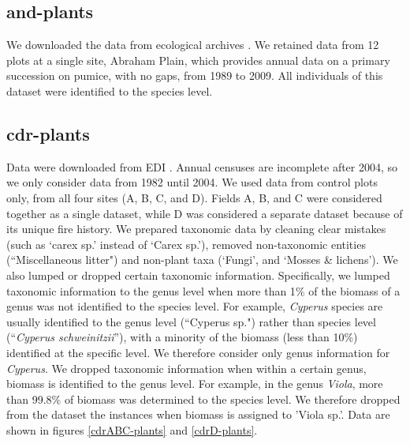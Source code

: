\documentclass[11pt, oneside]{article}
\begin{document}
\subsection {and-plants}
We downloaded the data from ecological archives \citep{cdr-del_moral_thirty_2010}. We retained data from 12 plots at a single site, Abraham Plain, which provides annual data on a primary succession on pumice, with no gaps, from 1989 to 2009. All individuals of this dataset were identified to the species level.

\subsection {cdr-plants}
Data were downloaded from EDI \citep{cdr-plants}.
Annual censuses are incomplete after 2004, so we only consider data from 1982 until 2004. 
We used data from control plots only, from all four sites (A, B, C, and D). 
Fields A, B, and C were considered together as a single dataset, while D was considered a separate dataset because of its unique fire history.
We prepared taxonomic data by cleaning clear mistakes (such as `carex sp.' instead of `Carex sp.'), removed non-taxonomic entities (``Miscellaneous litter") and non-plant taxa (`Fungi', and `Mosses \& lichens').
We also lumped or dropped certain taxonomic information. 
Specifically, we lumped taxonomic information to the genus level when more than 1$\%$ of the biomass of a genus was not identified to the species level. 
For example, {\it Cyperus} species are usually identified to the genus level (``Cyperus  sp.") rather than species level (``{\it Cyperus schweinitzii}''), with a minority of the biomass (less than 10$\%$) identified at the specific level. We therefore consider only genus information for {\it Cyperus}. 
We dropped taxonomic information when within a certain genus, biomass is identified to the genus level. 
For example, in the genus {\it Viola}, more than 99.8$\%$ of biomass was determined to the species level. We therefore dropped from the dataset the instances when biomass is assigned to 'Viola sp.'.
Data are shown in figures \ref{cdrABC-plants} and \ref{cdrD-plants}.
\end{document}
